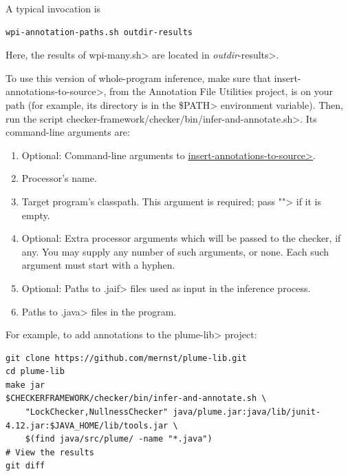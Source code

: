 A typical invocation is

\begin{Verbatim}
wpi-annotation-paths.sh outdir-results
\end{Verbatim}

Here, the results of \<wpi-many.sh> are located in \<\emph{outdir}-results>.


\begin{sloppypar}
To use this version of whole-program inference, make sure that
\<insert-annotations-to-source>, from the Annotation File Utilities project,
is on your path (for example, its directory is in the \<\$PATH> environment variable).
Then, run the script \<checker-framework/checker/bin/infer-and-annotate.sh>.
Its command-line arguments are:
\end{sloppypar}

\begin{enumerate}
\item Optional: Command-line arguments to
  \href{https://checkerframework.org/annotation-file-utilities/#insert-annotations-to-source}{\<insert-annotations-to-source>}.
\item Processor's name.
\item Target program's classpath.  This argument is required; pass \<""> if it
  is empty.
\item Optional: Extra processor arguments which will be passed to the checker, if any.
  You may supply any number of such arguments, or none.  Each such argument
  must start with a hyphen.
\item Optional: Paths to \<.jaif> files used as input in the inference
    process.
\item Paths to \<.java> files in the program.
\end{enumerate}

For example, to add annotations to the \<plume-lib> project:
\begin{Verbatim}
git clone https://github.com/mernst/plume-lib.git
cd plume-lib
make jar
$CHECKERFRAMEWORK/checker/bin/infer-and-annotate.sh \
    "LockChecker,NullnessChecker" java/plume.jar:java/lib/junit-4.12.jar:$JAVA_HOME/lib/tools.jar \
    $(find java/src/plume/ -name "*.java")
# View the results
git diff
\end{Verbatim}

